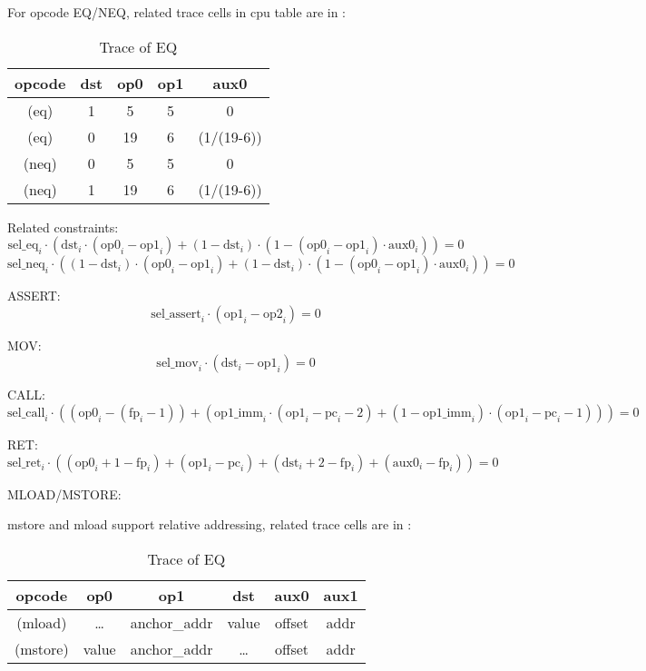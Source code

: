 For opcode EQ/NEQ, related trace cells in cpu table are in :
\begin{table}[!ht]
    \centering
    \begin{tabular}{|c|c|c|c|c|}
        \hline
        \rowcolor{gray} opcode & dst & op0 & op1 & aux0       \\
        \hline
        (eq)                   & 1   & 5   & 5   & 0          \\
        \hline
        (eq)                   & 0   & 19  & 6   & (1/(19-6)) \\
        \hline
        (neq)                  & 0   & 5   & 5   & 0          \\
        \hline
        (neq)                  & 1   & 19  & 6   & (1/(19-6)) \\
        \hline
    \end{tabular}
    \caption{Trace of EQ}
    \label{table:constraint-eq}
\end{table}

Related constraints:
\[ \mathrm{sel\_eq}_i \cdot (\mathrm{dst}_i \cdot (\mathrm{op0}_i - \mathrm{op1}_i) + (1 - \mathrm{dst}_i) \cdot (1 - (\mathrm{op0}_i - \mathrm{op1}_i) \cdot \mathrm{aux0}_i)) = 0 \]
\[ \mathrm{sel\_neq}_i \cdot ((1 - \mathrm{dst}_i) \cdot (\mathrm{op0}_i - \mathrm{op1}_i) + (1 - \mathrm{dst}_i) \cdot (1 - (\mathrm{op0}_i - \mathrm{op1}_i) \cdot \mathrm{aux0}_i)) = 0 \]

ASSERT:
\[ \mathrm{sel\_assert}_i \cdot (\mathrm{op1}_i - \mathrm{op2}_i) = 0 \]

MOV:
\[ \mathrm{sel\_mov}_i \cdot (\mathrm{dst}_i - \mathrm{op1}_i) = 0 \]

CALL:
\[ \mathrm{sel\_call}_i \cdot ((\mathrm{op0}_i - (\mathrm{fp}_i - 1))+(\mathrm{op1\_imm}_i \cdot (\mathrm{op1}_i - \mathrm{pc}_i - 2) + (1 - \mathrm{op1\_imm}_i) \cdot (\mathrm{op1}_i - \mathrm{pc}_i - 1)))=0 \]

RET:
\[ \mathrm{sel\_ret}_i \cdot ((\mathrm{op0}_i + 1 - \mathrm{fp}_i) + (\mathrm{op1}_i - \mathrm{pc}_i) + (\mathrm{dst}_i + 2 - \mathrm{fp}_i) + (\mathrm{aux0}_i - \mathrm{fp}_i))=0 \]

MLOAD/MSTORE:

mstore and mload support relative addressing, related trace cells are in :
\begin{table}[!ht]
    \centering
    \begin{tabular}{|c|c|c|c|c|c|}
        \hline
        \rowcolor{gray} opcode & op0   & op1          & dst   & aux0   & aux1 \\
        \hline
        (mload)                & \dots & anchor\_addr & value & offset & addr \\
        \hline
        (mstore)               & value & anchor\_addr & \dots & offset & addr \\
        \hline
    \end{tabular}
    \caption{Trace of EQ}
    \label{table:constraint-mstore-mload}
\end{table}


